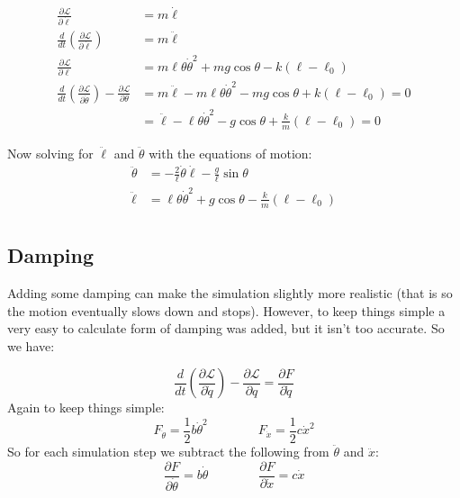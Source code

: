 \documentclass[letterpaper,8pt]{article}
\begin{document}
\begin{align*}
\frac{\partial \mathcal{L}}{\partial \dot{\ell}} &= m \dot{\ell} \\ 
\frac{d}{dt} \left( \frac{\partial \mathcal{L}}{\partial \dot{\ell}} \right) &= m \ddot{\ell} \\
\frac{\partial \mathcal{L}}{\partial \ell} &= m \ell \theta \dot{\theta}^2 + mg\cos\theta - k \left( \ell - \ell_0 \right) \\
\frac{d}{dt} \left( \frac{\partial \mathcal{L}}{\partial \dot{\theta}} \right) - \frac{\partial \mathcal{L}}{\partial \theta} &= 
  m \ddot{\ell} - m \ell \theta \dot{\theta}^2 - mg\cos\theta + k \left( \ell - \ell_0 \right) = 0 \\
&= \ddot{\ell} - \ell \theta \dot{\theta}^2 - g\cos\theta + \frac{k}{m} \left( \ell - \ell_0 \right) = 0 
\end{align*}

Now solving for $\ddot{\ell}$ and $\ddot{\theta}$ with the equations of motion:
\begin{align*}
\ddot{\theta} &= - \frac{2}{\ell}\dot{\theta} \dot{\ell} - \frac{g}{\ell} \sin \theta \\
\ddot{\ell}   &= \ell \theta \dot{\theta}^2 + g\cos\theta - \frac{k}{m} \left( \ell - \ell_0 \right) \\
\end{align*}


\subsection{Damping}

Adding some damping can make the simulation slightly more realistic (that is so the motion eventually slows down and stops).   However, 
to keep things simple a very easy to calculate form of damping was added, but it isn't too accurate.  So we have:

\[
\frac{d}{dt} \left( \frac{\partial \mathcal{L}}{\partial \dot{q}} \right) - \frac{\partial \mathcal{L}}{\partial q} 
= \frac{\partial F}{\partial \dot{q}}
\]
Again to keep things simple:
\[
F_{\dot{\theta}} = \frac{1}{2} b\dot{\theta}^2 
\qquad\qquad
F_{\dot{x}} = \frac{1}{2} c \dot{x}^2
\]
So for each simulation step we subtract the following from $\ddot{\theta}$ and $\ddot{x}$:
\[
\frac{\partial F}{\partial \dot{\theta}} = b\dot{\theta}
\qquad\qquad
\frac{\partial F}{\partial \dot{x}} = c\dot{x}
\]
\end{document}
